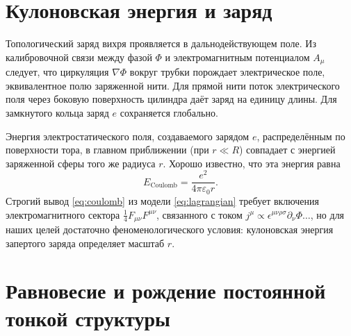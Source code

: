 \documentclass[12pt,a4paper]{article}
\begin{document}
\section{Кулоновская энергия и заряд}

Топологический заряд вихря проявляется в дальнодействующем поле. Из калибровочной связи между фазой $\Phi$ и электромагнитным потенциалом $A_\mu$ следует, что циркуляция $\nabla\Phi$ вокруг трубки порождает электрическое поле, эквивалентное полю заряженной нити. Для прямой нити поток электрического поля через боковую поверхность цилиндра даёт заряд на единицу длины. Для замкнутого кольца заряд $e$ сохраняется глобально.

Энергия электростатического поля, создаваемого зарядом $e$, распределённым по поверхности тора, в главном приближении (при $r \ll R$) совпадает с энергией заряженной сферы того же радиуса $r$. Хорошо известно, что эта энергия равна
\begin{equation}
E_{\text{Coulomb}} = \frac{e^2}{4\pi\varepsilon_0 r}.
\label{eq:coulomb}
\end{equation}
Строгий вывод \eqref{eq:coulomb} из модели \eqref{eq:lagrangian} требует включения электромагнитного сектора $\frac{1}{4} F_{\mu\nu}F^{\mu\nu}$, связанного с током $j^\mu \propto \epsilon^{\mu\nu\rho\sigma}\partial_\nu\Phi \dots$, но для наших целей достаточно феноменологического условия: кулоновская энергия запертого заряда определяет масштаб $r$.

\section{Равновесие и рождение постоянной тонкой структуры}
\end{document}
